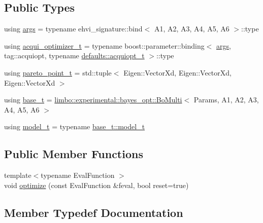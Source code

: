 \subsection*{Public Types}
\begin{DoxyCompactItemize}
\item 
using \hyperlink{classlimbo_1_1experimental_1_1bayes__opt_1_1_ehvi_a58d9809d76f0efc94ec9ec7a815e967b}{args} = typename ehvi\+\_\+signature\+::bind$<$ A1, A2, A3, A4, A5, A6 $>$\+::type
\item 
using \hyperlink{classlimbo_1_1experimental_1_1bayes__opt_1_1_ehvi_a981a7ea28359721ff4a0c26d6d99a6c7}{acqui\+\_\+optimizer\+\_\+t} = typename boost\+::parameter\+::binding$<$ \hyperlink{classlimbo_1_1bayes__opt_1_1_bo_base_a800d7d9dec5ac0c12b93150f12db9be3}{args}, tag\+::acquiopt, typename \hyperlink{structlimbo_1_1experimental_1_1bayes__opt_1_1_ehvi_1_1defaults_aa57e9da768ea83c6b467b8e9f31da835}{defaults\+::acquiopt\+\_\+t} $>$\+::type
\item 
using \hyperlink{classlimbo_1_1experimental_1_1bayes__opt_1_1_ehvi_a5014029489a3c6a510cf54632cce309b}{pareto\+\_\+point\+\_\+t} = std\+::tuple$<$ Eigen\+::\+Vector\+Xd, Eigen\+::\+Vector\+Xd, Eigen\+::\+Vector\+Xd $>$
\item 
using \hyperlink{classlimbo_1_1experimental_1_1bayes__opt_1_1_ehvi_ab01f05dc353ef1ba698cf856bea5fcf5}{base\+\_\+t} = \hyperlink{classlimbo_1_1experimental_1_1bayes__opt_1_1_bo_multi}{limbo\+::experimental\+::bayes\+\_\+opt\+::\+Bo\+Multi}$<$ Params, A1, A2, A3, A4, A5, A6 $>$
\item 
using \hyperlink{classlimbo_1_1experimental_1_1bayes__opt_1_1_ehvi_a68c468aa4910dd82e2aeec342215f1ba}{model\+\_\+t} = typename \hyperlink{classlimbo_1_1bayes__opt_1_1_bo_base_a5e23d523dd2a16b866a2660721b937bb}{base\+\_\+t\+::model\+\_\+t}
\end{DoxyCompactItemize}
\subsection*{Public Member Functions}
\begin{DoxyCompactItemize}
\item 
{\footnotesize template$<$typename Eval\+Function $>$ }\\void \hyperlink{classlimbo_1_1experimental_1_1bayes__opt_1_1_ehvi_a44003c1ef6450cbcce18e5c978e30f2c}{optimize} (const Eval\+Function \&feval, bool reset=true)
\end{DoxyCompactItemize}


\subsection{Member Typedef Documentation}
